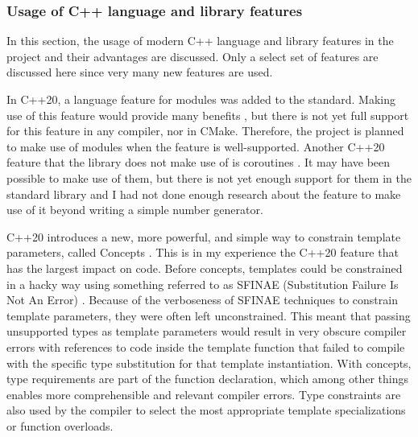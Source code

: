 \documentclass[12pt, a4paper]{article}
\begin{document}
\subsubsection{Usage of C++ language and library features}\label{sec:UsageOfFeatures}
In this section, the usage of modern C++ language and library features in the project and their advantages are discussed. Only a select set of features are discussed here since very many new features are used.

In C++20, a language feature for modules was added to the standard. Making use of this feature would provide many benefits \parencite{AdvantagesOfCppModules}, but there is not yet full support for this feature in any compiler, nor in CMake. Therefore, the project is planned to make use of modules when the feature is well-supported. Another C++20 feature that the library does not make use of is coroutines \parencite{CppCoroutines}. It may have been possible to make use of them, but there is not yet enough support for them in the standard library and I had not done enough research about the feature to make use of it beyond writing a simple number generator.

C++20 introduces a new, more powerful, and simple way to constrain template parameters, called Concepts \parencite{CppConstraints}. This is in my experience the C++20 feature that has the largest impact on code. Before concepts, templates could be constrained in a hacky way using something referred to as SFINAE (Substitution Failure Is Not An Error) \parencite{CppSFINAE}. Because of the verboseness of SFINAE techniques to constrain template parameters, they were often left unconstrained. This meant that passing unsupported types as template parameters would result in very obscure compiler errors with references to code inside the template function that failed to compile with the specific type substitution for that template instantiation. With concepts, type requirements are part of the function declaration, which among other things enables more comprehensible and relevant compiler errors. Type constraints are also used by the compiler to select the most appropriate template specializations or function overloads.
\end{document}
